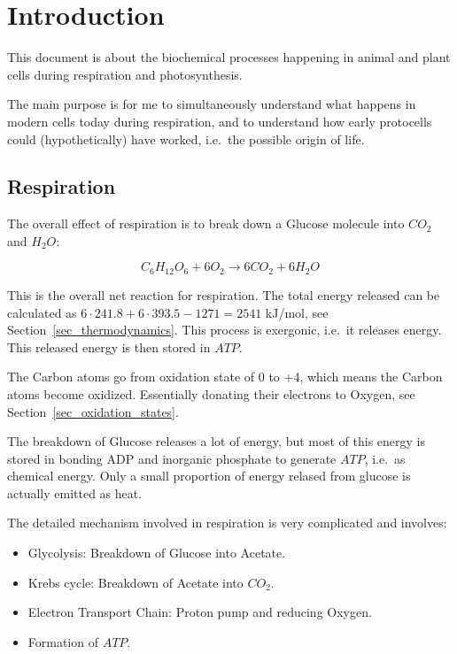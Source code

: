 \documentclass[a4paper,14pt]{extarticle}
\begin{document}

\section{Introduction}

This document is about the biochemical processes happening in animal and plant cells
during respiration and photosynthesis.

The main purpose is for me to simultaneously understand what happens in modern cells today
during respiration, and to understand how early protocells could (hypothetically) have
worked, i.e.\ the possible origin of life.

\subsection{Respiration}
The overall effect of respiration is to break down a Glucose molecule into $CO_2$ and
$H_2O$:

\[
    C_6H_{12}O_6 + 6O_2 \rightarrow 6CO_2 + 6H_2O
\]

This is the overall net reaction for respiration. The total energy released can be
calculated as $6\cdot 241.8 + 6\cdot 393.5 - 1271 = 2541$ kJ/mol, see
Section~\ref{sec_thermodynamics}.
This process is exergonic, i.e.\ it releases energy. This released energy is then stored
in $\mathit{ATP}$.

The Carbon atoms go from oxidation state of 0 to +4, which means the Carbon atoms become
oxidized. Essentially donating their electrons to Oxygen, see
Section~\ref{sec_oxidation_states}.

The breakdown of Glucose releases a lot of energy, but most of this energy is stored in
bonding ADP and inorganic phosphate to generate $\mathit{ATP}$, i.e.\ as chemical energy.
Only a small proportion of energy relased from glucose is actually emitted as heat.

The detailed mechanism involved in respiration is very complicated and involves:
\begin{itemize}
    \item Glycolysis: Breakdown of Glucose into Acetate.
    \item Krebs cycle: Breakdown of Acetate into $CO_2$.
    \item Electron Transport Chain: Proton pump and reducing Oxygen.
    \item Formation of $\mathit{ATP}$.
\end{itemize}
\end{document}
